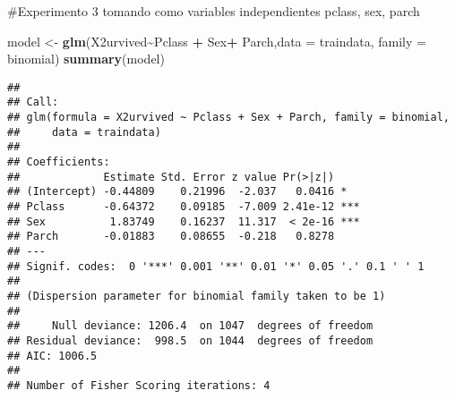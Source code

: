 \documentclass[
]{article}
\newenvironment{Shaded}{\begin{snugshade}}{\end{snugshade}}
\newcommand{\AttributeTok}[1]{\textcolor[rgb]{0.13,0.29,0.53}{#1}}
\newcommand{\DecValTok}[1]{\textcolor[rgb]{0.00,0.00,0.81}{#1}}
\newcommand{\FloatTok}[1]{\textcolor[rgb]{0.00,0.00,0.81}{#1}}
\newcommand{\FunctionTok}[1]{\textcolor[rgb]{0.13,0.29,0.53}{\textbf{#1}}}
\newcommand{\NormalTok}[1]{#1}
\newcommand{\OtherTok}[1]{\textcolor[rgb]{0.56,0.35,0.01}{#1}}
\newcommand{\SpecialCharTok}[1]{\textcolor[rgb]{0.81,0.36,0.00}{\textbf{#1}}}
\newcommand{\StringTok}[1]{\textcolor[rgb]{0.31,0.60,0.02}{#1}}
\begin{document}
\#Experimento 3 tomando como variables independientes pclass, sex, parch

\begin{Shaded}
\begin{Highlighting}[]
\NormalTok{model }\OtherTok{\textless{}{-}} \FunctionTok{glm}\NormalTok{(X2urvived}\SpecialCharTok{\textasciitilde{}}\NormalTok{Pclass }\SpecialCharTok{+}\NormalTok{ Sex}\SpecialCharTok{+}\NormalTok{ Parch,}\AttributeTok{data =}\NormalTok{ traindata, }\AttributeTok{family =}\NormalTok{ binomial)}
             \FunctionTok{summary}\NormalTok{(model)}
\end{Highlighting}
\end{Shaded}

\begin{verbatim}
## 
## Call:
## glm(formula = X2urvived ~ Pclass + Sex + Parch, family = binomial, 
##     data = traindata)
## 
## Coefficients:
##             Estimate Std. Error z value Pr(>|z|)    
## (Intercept) -0.44809    0.21996  -2.037   0.0416 *  
## Pclass      -0.64372    0.09185  -7.009 2.41e-12 ***
## Sex          1.83749    0.16237  11.317  < 2e-16 ***
## Parch       -0.01883    0.08655  -0.218   0.8278    
## ---
## Signif. codes:  0 '***' 0.001 '**' 0.01 '*' 0.05 '.' 0.1 ' ' 1
## 
## (Dispersion parameter for binomial family taken to be 1)
## 
##     Null deviance: 1206.4  on 1047  degrees of freedom
## Residual deviance:  998.5  on 1044  degrees of freedom
## AIC: 1006.5
## 
## Number of Fisher Scoring iterations: 4
\end{verbatim}

\begin{Shaded}
\end{Shaded}
\end{document}
